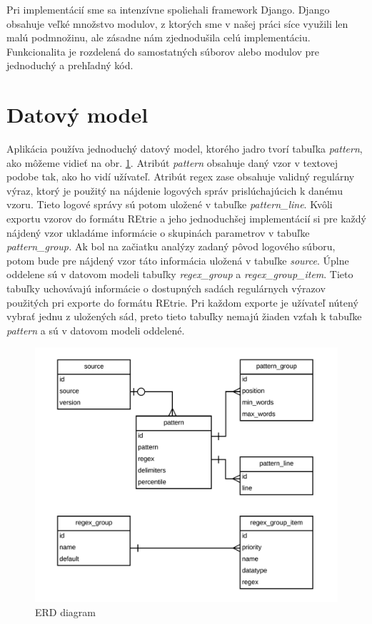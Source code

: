  
Pri implementácií sme sa intenzívne spoliehali framework Django. Django obsahuje veľké množstvo modulov, z ktorých sme v našej práci síce využili len malú podmnožinu, ale zásadne nám zjednodušila celú implementáciu. Funkcionalita je rozdelená do samostatných súborov alebo modulov pre jednoduchý a prehľadný kód.

\section{Datový model}
Aplikácia používa jednoduchý datový model, ktorého jadro tvorí tabuľka \emph{pattern}, ako môžeme vidieť na obr. \ref{fig:erd}. Atribút \emph{pattern} obsahuje daný vzor v textovej podobe tak, ako ho vidí užívateľ. Atribút regex zase obsahuje validný regulárny výraz, ktorý je použitý na nájdenie logových správ prislúchajúcich k danému vzoru. Tieto logové správy sú potom uložené v tabuľke \emph{pattern\_line}. Kvôli exportu vzorov do formátu REtrie a jeho jednoduchšej implementácií si pre každý nájdený vzor ukladáme informácie o skupinách parametrov v tabuľke \emph{pattern\_group.} Ak bol na začiatku analýzy zadaný pôvod logového súboru, potom bude pre nájdený vzor táto informácia uložená v tabuľke \emph{source}. Úplne oddelene sú v datovom modeli tabuľky \emph{regex\_group} a \emph{regex\_group\_item}. Tieto tabuľky uchovávajú informácie o dostupných sadách regulárnych výrazov použitých pri exporte do formátu REtrie. Pri každom exporte je užívateľ nútený vybrať jednu z uložených sád, preto tieto tabuľky nemajú žiaden vzťah k tabuľke \emph{pattern} a sú v datovom modeli oddelené.

\begin{figure}[htbp]
 \centering 
 \begin{minipage}{0.95\linewidth}
 	\centering
 	\includegraphics[width=\textwidth]{Images/thesis-erd.png}	
 \end{minipage}
  \caption{ERD diagram}
  \label{fig:erd}
\end{figure}

